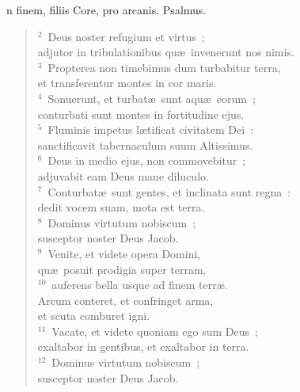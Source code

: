 \bchapter
{}n finem, filiis Core, pro arcanis. Psalmus.
\begin{flushleft}\begin{verse}\vspace{6pt}${}^{2}$~Deus noster refugium et virtus~;\\ adjutor in tribulationibus qu\ae\ invenerunt nos nimis.\\
${}^{3}$~Propterea non timebimus dum turbabitur terra,\\ et transferentur montes in cor maris.\\
${}^{4}$~Sonuerunt, et turbat\ae\ sunt aqu\ae\ eorum~;\\ conturbati sunt montes in fortitudine ejus.\\
${}^{5}$~Fluminis impetus l\ae tificat civitatem Dei~:\\ sanctificavit tabernaculum suum Altissimus.\\
${}^{6}$~Deus in medio ejus, non commovebitur~;\\ adjuvabit eam Deus mane diluculo.\\
${}^{7}$~Conturbat\ae\ sunt gentes, et inclinata sunt regna~:\\ dedit vocem suam, mota est terra.\\
${}^{8}$~Dominus virtutum nobiscum~;\\ susceptor noster Deus Jacob.\\
${}^{9}$~Venite, et videte opera Domini,\\ qu\ae\ posuit prodigia super terram,\\
${}^{10}$~auferens bella usque ad finem terr\ae .\\ Arcum conteret, et confringet arma,\\ et scuta comburet igni.\\
${}^{11}$~Vacate, et videte quoniam ego sum Deus~;\\ exaltabor in gentibus, et exaltabor in terra.\\
${}^{12}$~Dominus virtutum nobiscum~;\\ susceptor noster Deus Jacob.\end{verse}\end{flushleft}



